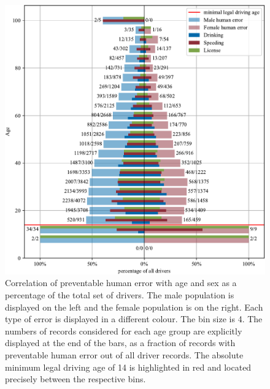 \documentclass{article}
\theoremstyle{plain}
\theoremstyle{definition}
\theoremstyle{remark}
\begin{document}
\begin{figure}[ht]
	\vskip 0.2in
	\begin{center}
		\centerline{\includegraphics[width=\columnwidth]{plots/err-demography}}
		\caption{Correlation of preventable human error with age and sex as a percentage of the total set of drivers. The male population is displayed on the left and the female population is on the right. Each type of error is displayed in a different colour. The bin size is 4. The numbers of records considered for each age group are explicitly displayed at the end of the bars, as a fraction of records with preventable human error out of all driver records. The absolute minimum legal driving age of 14 is highlighted in red and located precisely between the respective bins.}
		\label{fig:err-demography}
	\end{center}
	\vskip -0.2in
\end{figure}
\end{document}

